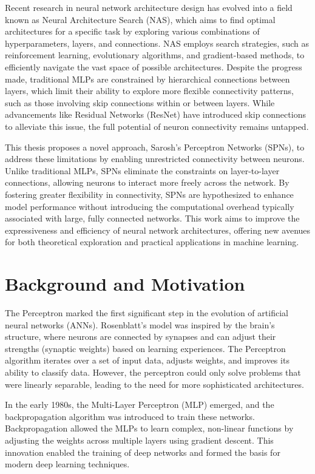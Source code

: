 Recent research in neural network architecture design has evolved into a field known as Neural Architecture Search (NAS), which aims to find optimal architectures for a specific task by exploring various combinations of hyperparameters, layers, and connections. NAS employs search strategies, such as reinforcement learning, evolutionary algorithms, and gradient-based methods, to efficiently navigate the vast space of possible architectures. Despite the progress made, traditional MLPs are constrained by hierarchical connections between layers, which limit their ability to explore more flexible connectivity patterns, such as those involving skip connections within or between layers. While advancements like Residual Networks (ResNet) have introduced skip connections to alleviate this issue, the full potential of neuron connectivity remains untapped.

This thesis proposes a novel approach, Sarosh's Perceptron Networks (SPNs), to address these limitations by enabling unrestricted connectivity between neurons. Unlike traditional MLPs, SPNs eliminate the constraints on layer-to-layer connections, allowing neurons to interact more freely across the network. By fostering greater flexibility in connectivity, SPNs are hypothesized to enhance model performance without introducing the computational overhead typically associated with large, fully connected networks. This work aims to improve the expressiveness and efficiency of neural network architectures, offering new avenues for both theoretical exploration and practical applications in machine learning.


\section{Background and Motivation}
The Perceptron marked the first significant step in the evolution of artificial neural networks (ANNs). Rosenblatt’s model was inspired by the brain's structure, where neurons are connected by synapses and can adjust their strengths (synaptic weights) based on learning experiences. The Perceptron algorithm iterates over a set of input data, adjusts weights, and improves its ability to classify data. However, the perceptron could only solve problems that were linearly separable, leading to the need for more sophisticated architectures.

In the early 1980s, the Multi-Layer Perceptron (MLP) emerged, and the backpropagation algorithm was introduced to train these networks. Backpropagation allowed the MLPs to learn complex, non-linear functions by adjusting the weights across multiple layers using gradient descent. This innovation enabled the training of deep networks and formed the basis for modern deep learning techniques.

